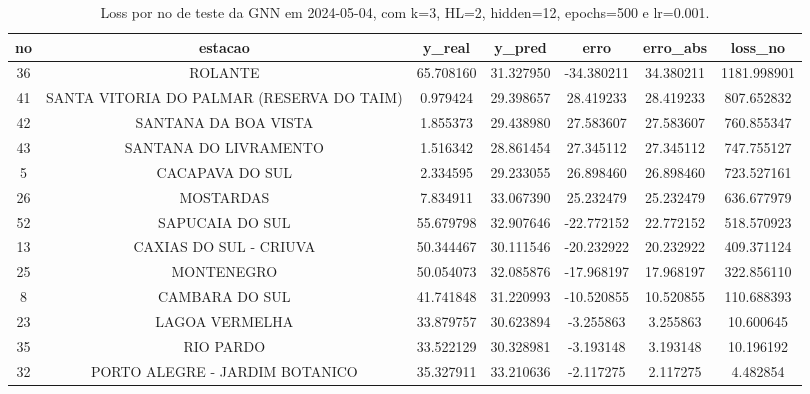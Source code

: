 \begin{table}[h]
\centering
\caption{Loss por no de teste da GNN em 2024-05-04, com k=3, HL=2, hidden=12, epochs=500 e lr=0.001.}
\label{tab:gnn_loss_k3_hl2_h12_e500_d20240504}
\begin{tabular}{ccccccc}
\toprule
no & estacao & y\_real & y\_pred & erro & erro\_abs & loss\_no \\
\midrule
36 & ROLANTE & 65.708160 & 31.327950 & -34.380211 & 34.380211 & 1181.998901 \\
41 & SANTA VITORIA DO PALMAR (RESERVA DO TAIM) & 0.979424 & 29.398657 & 28.419233 & 28.419233 & 807.652832 \\
42 & SANTANA DA BOA VISTA & 1.855373 & 29.438980 & 27.583607 & 27.583607 & 760.855347 \\
43 & SANTANA DO LIVRAMENTO & 1.516342 & 28.861454 & 27.345112 & 27.345112 & 747.755127 \\
5 & CACAPAVA DO SUL & 2.334595 & 29.233055 & 26.898460 & 26.898460 & 723.527161 \\
26 & MOSTARDAS & 7.834911 & 33.067390 & 25.232479 & 25.232479 & 636.677979 \\
52 & SAPUCAIA DO SUL & 55.679798 & 32.907646 & -22.772152 & 22.772152 & 518.570923 \\
13 & CAXIAS DO SUL - CRIUVA & 50.344467 & 30.111546 & -20.232922 & 20.232922 & 409.371124 \\
25 & MONTENEGRO & 50.054073 & 32.085876 & -17.968197 & 17.968197 & 322.856110 \\
8 & CAMBARA DO SUL & 41.741848 & 31.220993 & -10.520855 & 10.520855 & 110.688393 \\
23 & LAGOA VERMELHA & 33.879757 & 30.623894 & -3.255863 & 3.255863 & 10.600645 \\
35 & RIO PARDO & 33.522129 & 30.328981 & -3.193148 & 3.193148 & 10.196192 \\
32 & PORTO ALEGRE - JARDIM BOTANICO & 35.327911 & 33.210636 & -2.117275 & 2.117275 & 4.482854 \\
\bottomrule
\end{tabular}
\end{table}
